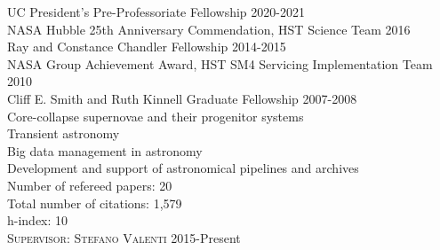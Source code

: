 \documentclass[10pt]{cv}
\begin{document}
\begin{llist}
\vspace{-0.1in}   
UC President's Pre-Professoriate Fellowship \hfill 2020-2021\\
NASA Hubble 25th Anniversary Commendation, HST Science Team \hfill 2016 \\ %
Ray and Constance Chandler Fellowship \hfill 2014-2015 \\ %
NASA Group Achievement Award, HST SM4 Servicing Implementation Team \hfill2010 \\
Cliff E. Smith and Ruth Kinnell Graduate Fellowship \hfill 2007-2008\\ %
\vspace{-0.1in}   
Core-collapse supernovae and their progenitor systems\\
Transient astronomy\\
Big data management in astronomy\\
Development and support of astronomical pipelines and archives\\ 
\vspace{-0.1in}   
\vspace{-0.1in}   
Number of refereed papers: 20\\
Total number of citations: 1,579\\
h-index: 10\\
\vspace{-0.1in}   
\newpage
{} 
\textsc{Supervisor: Stefano Valenti} \hfill 2015-Present\\
\begin{minipage}[l]{0.7\textwidth}\vspace{0.15cm}

\end{minipage}
\end{llist}
\end{document}
